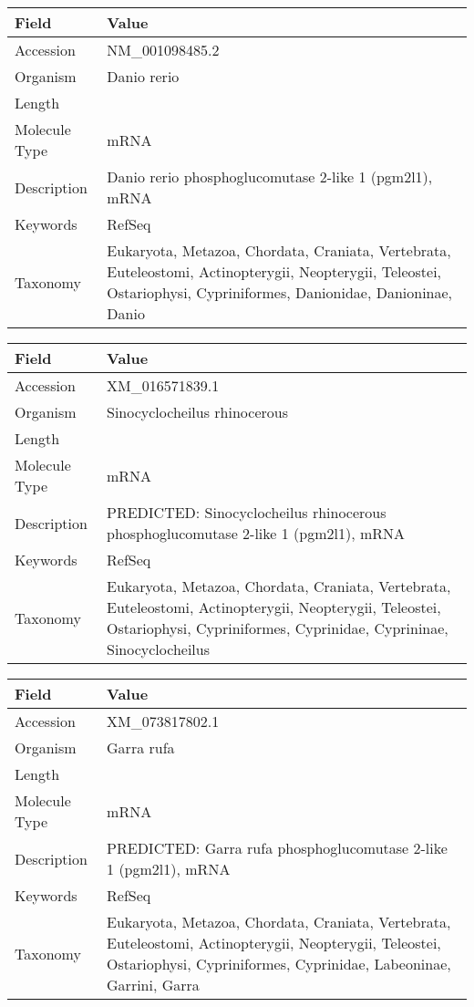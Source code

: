 \documentclass[10pt]{article}
\begin{document}
{\footnotesize
\begin{longtable}{>{\raggedright\arraybackslash}p{4.5cm} >{\raggedright\arraybackslash}p{11.5cm}}
\textbf{Field} & \textbf{Value} \\
\hline
Accession & NM\_001098485.2 \\
Organism & Danio rerio \\
Length & 3342 \\
Molecule Type & mRNA \\
Description & Danio rerio phosphoglucomutase 2-like 1 (pgm2l1), mRNA \\
Keywords & RefSeq \\
Taxonomy & Eukaryota, Metazoa, Chordata, Craniata, Vertebrata, Euteleostomi, Actinopterygii, Neopterygii, Teleostei, Ostariophysi, Cypriniformes, Danionidae, Danioninae, Danio \\
\end{longtable}
}

{\footnotesize
\begin{longtable}{>{\raggedright\arraybackslash}p{4.5cm} >{\raggedright\arraybackslash}p{11.5cm}}
\textbf{Field} & \textbf{Value} \\
\hline
Accession & XM\_016571839.1 \\
Organism & Sinocyclocheilus rhinocerous \\
Length & 3976 \\
Molecule Type & mRNA \\
Description & PREDICTED: Sinocyclocheilus rhinocerous phosphoglucomutase 2-like 1 (pgm2l1), mRNA \\
Keywords & RefSeq \\
Taxonomy & Eukaryota, Metazoa, Chordata, Craniata, Vertebrata, Euteleostomi, Actinopterygii, Neopterygii, Teleostei, Ostariophysi, Cypriniformes, Cyprinidae, Cyprininae, Sinocyclocheilus \\
\end{longtable}
}

{\footnotesize
\begin{longtable}{>{\raggedright\arraybackslash}p{4.5cm} >{\raggedright\arraybackslash}p{11.5cm}}
\textbf{Field} & \textbf{Value} \\
\hline
Accession & XM\_073817802.1 \\
Organism & Garra rufa \\
Length & 3057 \\
Molecule Type & mRNA \\
Description & PREDICTED: Garra rufa phosphoglucomutase 2-like 1 (pgm2l1), mRNA \\
Keywords & RefSeq \\
Taxonomy & Eukaryota, Metazoa, Chordata, Craniata, Vertebrata, Euteleostomi, Actinopterygii, Neopterygii, Teleostei, Ostariophysi, Cypriniformes, Cyprinidae, Labeoninae, Garrini, Garra \\
\end{longtable}
}
\end{document}
